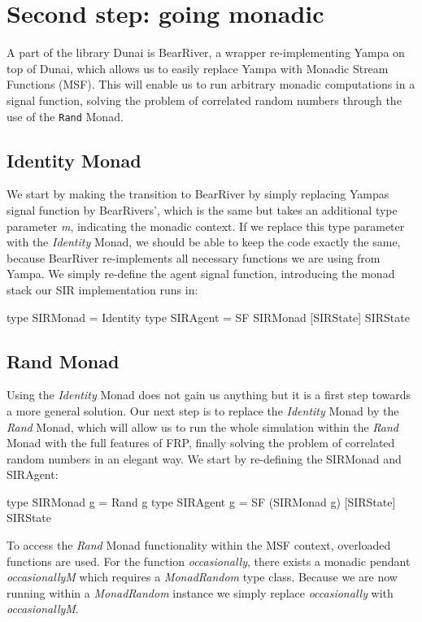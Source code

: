 \section{Second step: going monadic}
\label{sec:timedriven_monadic}
A part of the library Dunai is BearRiver, a wrapper re-implementing Yampa on top of Dunai, which allows us to easily replace Yampa with Monadic Stream Functions (MSF). This will enable us to run arbitrary monadic computations in a signal function, solving the problem of correlated random numbers through the use of the \texttt{Rand} Monad.

\subsection{Identity Monad}
We start by making the transition to BearRiver by simply replacing Yampas signal function by BearRivers', which is the same but takes an additional type parameter \textit{m}, indicating the monadic context. If we replace this type parameter with the \textit{Identity} Monad, we should be able to keep the code exactly the same, because BearRiver re-implements all necessary functions we are using from Yampa. We simply re-define the agent signal function, introducing the monad stack our SIR implementation runs in:

\begin{HaskellCode}
type SIRMonad = Identity
type SIRAgent = SF SIRMonad [SIRState] SIRState
\end{HaskellCode}

\subsection{Rand Monad}
Using the \textit{Identity} Monad does not gain us anything but it is a first step towards a more general solution. Our next step is to replace the \textit{Identity} Monad by the \textit{Rand} Monad, which will allow us to run the whole simulation within the \textit{Rand} Monad with the full features of FRP, finally solving the problem of correlated random numbers in an elegant way. We start by re-defining the SIRMonad and SIRAgent:

\begin{HaskellCode}
type SIRMonad g = Rand g
type SIRAgent g = SF (SIRMonad g) [SIRState] SIRState
\end{HaskellCode}

To access the \textit{Rand} Monad functionality within the MSF context, overloaded functions are used. For the function \textit{occasionally}, there exists a monadic pendant \textit{occasionallyM} which requires a \textit{MonadRandom} type class. Because we are now running within a \textit{MonadRandom} instance we simply replace \textit{occasionally} with \textit{occasionallyM}. 

